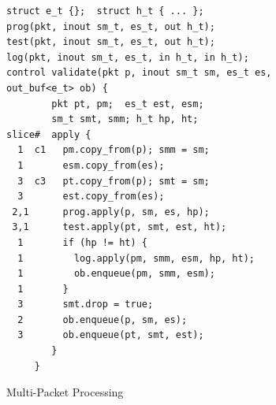 

\begin{figure}
\begin{lstlisting}[frame=none]
struct e_t {};  struct h_t { ... };
prog(pkt, inout sm_t, es_t, out h_t);
test(pkt, inout sm_t, es_t, out h_t);
log(pkt, inout sm_t, es_t, in h_t, in h_t);
control validate(pkt p, inout sm_t sm, es_t es, out_buf<e_t> ob) {
        pkt pt, pm;  es_t est, esm;  
        sm_t smt, smm; h_t hp, ht;
slice#  apply {
  1  c1   pm.copy_from(p); smm = sm; 
  1       esm.copy_from(es);
  3  c3   pt.copy_from(p); smt = sm; 
  3       est.copy_from(es);
 2,1      prog.apply(p, sm, es, hp); 
 3,1      test.apply(pt, smt, est, ht); 
  1       if (hp != ht) {
  1         log.apply(pm, smm, esm, hp, ht);
  1         ob.enqueue(pm, smm, esm);
  1       }
  3       smt.drop = true;
  2       ob.enqueue(p, sm, es);
  3       ob.enqueue(pt, smt, est);
        }
     }
\end{lstlisting}
\caption{Multi-Packet Processing}
\label{fig:multi-packet-processing}
\end{figure}




